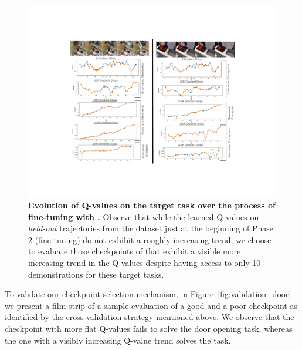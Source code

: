 \begin{figure}[h]
\centering
  \includegraphics[width=0.6\linewidth]{chapters/ptr/Fig_rebuttal.pdf}
  \vspace{-0.1cm}
  \caption{\footnotesize \textbf{Evolution of Q-values on the target task over the process of fine-tuning with \ptrmethodname.} Observe that while the learned Q-values on \emph{held-out} trajectories from the dataset just at the beginning of Phase 2 (fine-tuning) do not exhibit a roughly increasing trend, we choose to evaluate those checkpoints of \ptrmethodname that exhibit a visible more increasing trend in the Q-values despite having access to only 10 demonstrations for these target tasks.}
  \label{fig:moreexreb}
  \vspace{-0.1cm}
\end{figure}

To validate our checkpoint selection mechanism, in Figure~\ref{fig:validation_door} we present a film-strip of a sample evaluation of a good and a poor checkpoint as identified by the cross-validation strategy mentioned above. We observe that the checkpoint with more flat Q-values fails to solve the door opening task, whereas the one with a visibly increasing Q-value trend solves the task.

